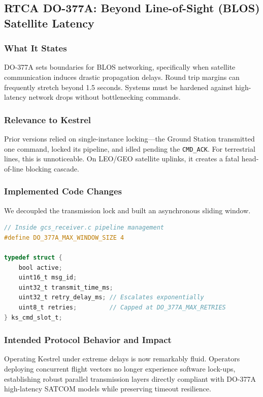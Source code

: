 \documentclass[11pt,a4paper]{article}
\begin{document}
\vspace{0.5cm}

\subsection{RTCA DO-377A: Beyond Line-of-Sight (BLOS) Satellite Latency}

\subsubsection{What It States}
DO-377A sets boundaries for BLOS networking, specifically when satellite communication induces drastic propagation delays. Round trip margins can frequently stretch beyond 1.5 seconds. Systems must be hardened against high-latency network drops without bottlenecking commands.

\subsubsection{Relevance to Kestrel}
Prior versions relied on single-instance locking—the Ground Station transmitted one command, locked its pipeline, and idled pending the \texttt{CMD\_ACK}. For terrestrial lines, this is unnoticeable. On LEO/GEO satellite uplinks, it creates a fatal head-of-line blocking cascade.

\subsubsection{Implemented Code Changes}

We decoupled the transmission lock and built an asynchronous sliding window.

\begin{lstlisting}[language=C, caption={Sliding Window Allocation Structure (\texttt{gcs\_receiver.c})}]
// Inside gcs_receiver.c pipeline management
#define DO_377A_MAX_WINDOW_SIZE 4 

typedef struct {
    bool active;
    uint16_t msg_id;
    uint32_t transmit_time_ms;
    uint32_t retry_delay_ms; // Escalates exponentially
    uint8_t retries;         // Capped at DO_377A_MAX_RETRIES
} ks_cmd_slot_t;
\end{lstlisting}

\subsubsection{Intended Protocol Behavior and Impact}
Operating Kestrel under extreme delays is now remarkably fluid. Operators deploying concurrent flight vectors no longer experience software lock-ups, establishing robust parallel transmission layers directly compliant with DO-377A high-latency SATCOM models while preserving timeout resilience.
\end{document}

